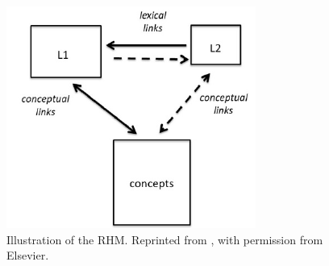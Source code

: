 \documentclass[output=paper,colorlinks,citecolor=brown,nonflat]{langsci/langscibook}
\begin{document}
\begin{figure}
    \includegraphics[width=\textwidth]{figures/Gudmundson-fig1.pdf}
    \caption{Illustration of the RHM. Reprinted from \citet{KrollStewart1994}, with permission from Elsevier.}
    \label{fig:gudmundson:1}
\end{figure}
\end{document}
